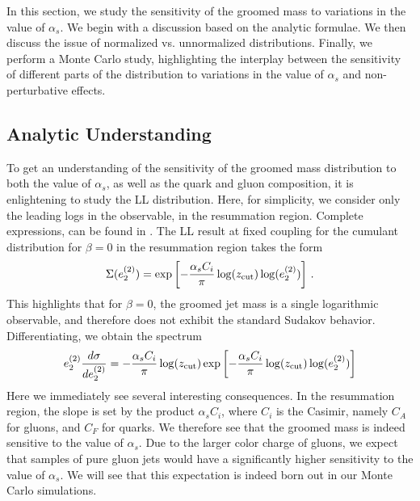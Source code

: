 
In this section, we study the sensitivity of the groomed mass to variations in the value of $\alpha_s$. We begin with a discussion based on the analytic formulae. We then discuss the issue of normalized vs. unnormalized distributions. Finally, we perform a Monte Carlo study, highlighting the interplay between the sensitivity of different parts of the distribution to variations in the value of $\alpha_s$ and non-perturbative effects.


\subsection{Analytic Understanding}\label{sec:analytic}

To get an understanding of the sensitivity of the groomed mass distribution to both the value of $\alpha_s$, as well as the quark and gluon composition, it is enlightening to study the LL distribution. Here, for simplicity, we consider only the leading logs in the observable, in the resummation region. Complete expressions, can be found in \cite{Larkoski:2014wba,Frye:2016aiz,Marzani:2017kqd,Marzani:2017mva}. The LL result at fixed coupling for the cumulant distribution for $\beta=0$ in the resummation region takes the form
\begin{align}
\Sigma(e_{2}^{(2)})=\exp\left[ - \frac{\alpha_s C_i}{\pi} \log(z_{\rm cut}) \log (e_{2}^{(2)}) \right]\,.
\end{align}
This highlights that for $\beta=0$, the groomed jet mass is a single logarithmic observable, and therefore does not exhibit the standard Sudakov behavior.
Differentiating, we obtain the spectrum
\begin{align}
e_{2}^{(2)}  \frac{d\sigma}{d e_{2}^{(2)}}=   - \frac{\alpha_s C_i}{\pi} \log(z_{\rm cut})   \exp\left[ - \frac{\alpha_s C_i}{\pi}  \log(z_{\rm cut}) \log (e_{2}^{(2)}) \right]
\end{align}
Here we immediately see several interesting consequences. In the resummation region, the slope is set by the product $\alpha_s C_i$, where $C_i$ is the Casimir, namely $C_A$ for gluons, and $C_F$ for quarks. We therefore see that the groomed mass is indeed sensitive to the value of $\alpha_s$. Due to the larger color charge of gluons, we expect that samples of pure gluon jets would have a significantly higher sensitivity to the value of $\alpha_s$.  We will see that this expectation is indeed born out in our Monte Carlo simulations.  

